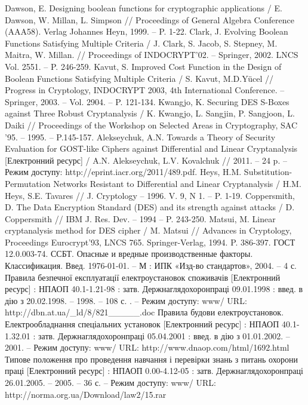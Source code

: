 \begin{thebibliography}{}
     Dawson, E. Designing boolean functions for cryptographic applications / E. Dawson, W. Millan, L. Simpson // Proceedings of General Algebra Conference (AAA58).  Verlag Johannes Heyn, 1999. -- P. 1-22.
     Clark, J. Evolving Boolean Functions Satisfying Multiple Criteria / J. Clark, S. Jacob, S. Stepney, M. Maitra, W. Millan. // Proceedings of INDOCRYPT’02. -- Springer, 2002. LNCS Vol. 2551. -- P. 246-259.
     Kavut, S. Improved Cost Function in the Design of Boolean Functions Satisfying Multiple Criteria / S. Kavut, M.D.Yücel // Progress in Cryptology, INDOCRYPT 2003, 4th International Conference. -- Springer, 2003. -- Vol. 2904. -- P. 121-134.
     Kwangjo, K. Securing DES S-Boxes against Three Robust Cryptanalysis / K. Kwangjo, L. Sangjin, P. Sangjoon, L. Daiki // Proceedings of the Workshop on Selected Areas in Cryptography, SAC '95. -- 1995. -- P.145-157.
     Alekseychuk, A.N. Towards a Theory of Security Evaluation for GOST-like Ciphers against Differential and Linear Cryptanalysis [Електронний ресурс] / A.N. Alekseychuk, L.V. Kovalchuk // 2011. -- 24 p. -- Режим доступу: http://eprint.iacr.org/2011/489.pdf.
     Heys, H.M. Substitution-Permutation Networks Resistant to Differential and Linear Cryptanalysis / H.M. Heys, S.E. Tavares // J. Cryptology -- 1996. V. 9, N 1. -- P. 1-19.
     Coppersmith, D. The Data Encryption Standard (DES) and its strength against attacks / D. Coppersmith // IBM J. Res. Dev. -- 1994 -- P. 243-250.
     Matsui, M. Linear cryptanalysis method for DES cipher / M. Matsui // Advances in Cryptology, Proceedings Eurocrypt’93, LNCS 765. Springer-Verlag, 1994. P. 386-397.
     ГОСТ 12.0.003-74. ССБТ. Опасные и вредные производственные факторы. Классификация. Введ. 1976-01-01. -- М : ИПК «Изд-во стандартов», 2004. -- 4 с.
     Правила безпечної експлуатації електроустановок споживачів [Електронний ресурс] : НПАОП 40.1-1.21-98 : затв. Держнаглядохоронпраці 09.01.1998 : введ. в дію з 20.02.1998. -- 1998. -- 108 с. . -- Режим доступу: www/ URL: http://dbn.at.ua/\_ld/8/821\_\_\_\_\_.doc
     Правила будови електроустановок. Електрообладнання спеціальних установок [Електронний ресурс] : НПАОП 40.1-1.32.01 : затв. Держнаглядохоронпраці 05.04.2001 : введ. в дію з 01.01.2002. -- 2001. -- Режим доступу: www/ URL: http://www.dnaop.com/html/1692.html
     Типове положення про проведення навчання і перевірки знань з питань охорони праці [Електронний ресурс] : НПАОП 0.00-4.12-05 : затв. Держнаглядохоронпраці 26.01.2005. -- 2005. -- 36 с. -- Режим доступу: www/ URL: http://norma.org.ua/Download/law2/15.rar

\end{thebibliography}
